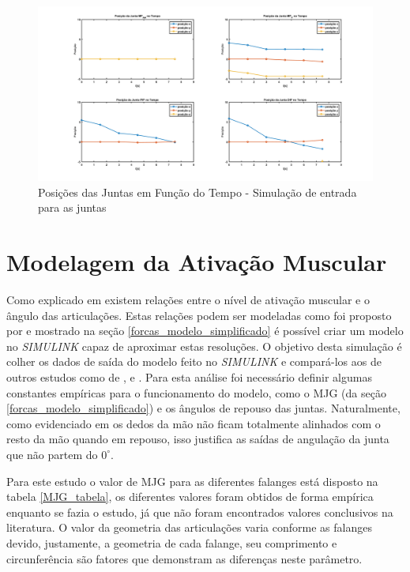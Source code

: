 \begin{figure}[H]
\centering
\includegraphics[width = 1\textwidth]{img/todas_juntas.png}
\caption[Posições das Juntas em Função do Tempo - Simulação de entrada para as juntas]{Posições das Juntas em Função do Tempo - Simulação de entrada para as juntas}
\label{ang_sim_DH}
\end{figure}

\section{Modelagem da Ativação Muscular}
\label{resultado_ativacao}
Como explicado em \cite{zajac1989muscle} existem relações entre o nível de ativação muscular e o ângulo das articulações. Estas relações podem ser modeladas como foi proposto por \cite{feng1999surface} e mostrado na seção \ref{forcas_modelo_simplificado} é possível criar um modelo no \textit{SIMULINK} capaz de aproximar estas resoluções. O objetivo desta simulação é colher os dados de saída do modelo feito no \textit{SIMULINK} e compará-los aos de outros estudos como de \cite{zajac1989muscle}, \cite{rosen1999performances} e \cite{feng1999surface}. Para esta análise foi necessário definir algumas constantes empíricas para o funcionamento do modelo, como o MJG (da seção \ref{forcas_modelo_simplificado}) e os ângulos de repouso das juntas. Naturalmente, como evidenciado em \cite{lin2000modeling} os dedos da mão não ficam totalmente alinhados com o resto da mão quando em repouso, isso justifica as saídas de angulação da junta que não partem do $0^\circ$. 

Para este estudo o valor de MJG para as diferentes falanges está disposto na tabela \ref{MJG_tabela}, os diferentes valores foram obtidos de forma empírica enquanto se fazia o estudo, já que não foram encontrados valores conclusivos na literatura. O valor da geometria das articulações varia conforme as falanges devido, justamente, a geometria de cada falange, seu comprimento e circunferência são fatores que demonstram as diferenças neste parâmetro.


